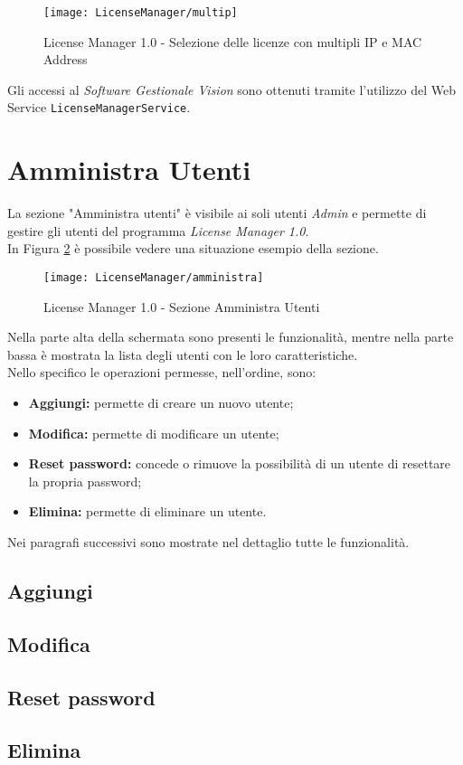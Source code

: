 \begin{figure}[!h] 
    \centering 
    \texttt{[image: LicenseManager/multip]} 
    \caption{License Manager 1.0 - Selezione delle licenze con multipli IP e MAC Address}
\label{multip}

\end{figure}

Gli accessi al \textit{Software Gestionale Vision} sono ottenuti tramite l'utilizzo del Web Service \texttt{LicenseManagerService}.


\section{Amministra Utenti}

La sezione "Amministra utenti" è visibile ai soli utenti \textit{Admin} e permette di gestire gli utenti del programma \textit{License Manager 1.0}.\\
In Figura \ref{amm} è possibile vedere una situazione esempio della sezione.
\begin{figure}[!h] 
    \centering 
    \texttt{[image: LicenseManager/amministra]} 
    \caption{License Manager 1.0 - Sezione Amministra Utenti}
\label{amm}

\end{figure}

Nella parte alta della schermata sono presenti le funzionalità, mentre nella parte bassa è mostrata la lista degli utenti con le loro caratteristiche.\\
Nello specifico le operazioni permesse, nell'ordine, sono:
\begin{itemize}
\item \textbf{Aggiungi:} permette di creare un nuovo utente;
\item \textbf{Modifica:} permette di modificare un utente;
\item \textbf{Reset password:} concede o rimuove la possibilità di un utente di resettare la propria password;
\item \textbf{Elimina:} permette di eliminare un utente.
\end{itemize}

Nei paragrafi successivi sono mostrate nel dettaglio tutte le funzionalità. 

\subsection{Aggiungi}

\subsection{Modifica}

\subsection{Reset password}

\subsection{Elimina}